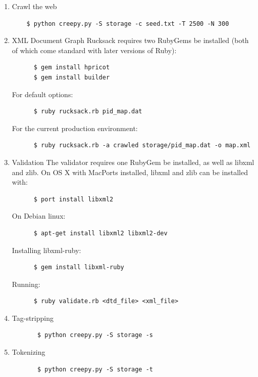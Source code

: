 \documentclass[letterpaper,11pt,twoside]{article}
\begin{document}
\begin{enumerate}
	\item Crawl the web	
	\begin{verbatim}
	$ python creepy.py -S storage -c seed.txt -T 2500 -N 300
	\end{verbatim}
	
	\item XML Document Graph
	Rucksack requires two RubyGems be installed (both of which come standard with later versions of Ruby):
	\begin{verbatim}
	  $ gem install hpricot
	  $ gem install builder
	\end{verbatim}
	For default options:
	\begin{verbatim}
	  $ ruby rucksack.rb pid_map.dat
	\end{verbatim}
	For the current production environment:
	\begin{verbatim}
	  $ ruby rucksack.rb -a crawled storage/pid_map.dat -o map.xml
	\end{verbatim}
	
	\item Validation
	The validator requires one RubyGem be installed, as well as libxml and zlib.
	On OS X with MacPorts installed, libxml and zlib can be installed with:
	\begin{verbatim}
	  $ port install libxml2
	\end{verbatim}
	On Debian linux:
	\begin{verbatim}
	  $ apt-get install libxml2 libxml2-dev
	\end{verbatim}
	Installing libxml-ruby:
	\begin{verbatim}
	  $ gem install libxml-ruby
	\end{verbatim}
	Running:
	\begin{verbatim}
	  $ ruby validate.rb <dtd_file> <xml_file>
	\end{verbatim}
	
	
	\item Tag-stripping
	\begin{verbatim} 
	   $ python creepy.py -S storage -s 
	\end{verbatim}
	
	\item Tokenizing
	\begin{verbatim} 
	   $ python creepy.py -S storage -t 
	\end{verbatim}
	
\end{enumerate}
\end{document}
